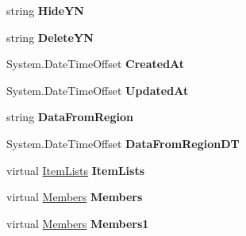 \begin{DoxyCompactItemize}
\item 
string {\bfseries Hide\+YN}\hypertarget{a00086_a8b5c381c2fc95ff3c9af4b7e09e40509}{}\label{a00086_a8b5c381c2fc95ff3c9af4b7e09e40509}

\item 
string {\bfseries Delete\+YN}\hypertarget{a00086_a3663bcb7a483754cc1fd3bb95c24a13a}{}\label{a00086_a3663bcb7a483754cc1fd3bb95c24a13a}

\item 
System.\+Date\+Time\+Offset {\bfseries Created\+At}\hypertarget{a00086_a8c30acc3e2c53178185283532017a44f}{}\label{a00086_a8c30acc3e2c53178185283532017a44f}

\item 
System.\+Date\+Time\+Offset {\bfseries Updated\+At}\hypertarget{a00086_a857bd29f955696106cbe25c9bc37d7ae}{}\label{a00086_a857bd29f955696106cbe25c9bc37d7ae}

\item 
string {\bfseries Data\+From\+Region}\hypertarget{a00086_a5726782f5a6932f232393bdb9df4190c}{}\label{a00086_a5726782f5a6932f232393bdb9df4190c}

\item 
System.\+Date\+Time\+Offset {\bfseries Data\+From\+Region\+DT}\hypertarget{a00086_a8ed62b55fc18a4419620138693a321e0}{}\label{a00086_a8ed62b55fc18a4419620138693a321e0}

\item 
virtual \hyperlink{a00127}{Item\+Lists} {\bfseries Item\+Lists}\hypertarget{a00086_a7217ae90802d5d8f4e247995ae04c122}{}\label{a00086_a7217ae90802d5d8f4e247995ae04c122}

\item 
virtual \hyperlink{a00145}{Members} {\bfseries Members}\hypertarget{a00086_a4b30bddd0e473bb3435fab0027792c06}{}\label{a00086_a4b30bddd0e473bb3435fab0027792c06}

\item 
virtual \hyperlink{a00145}{Members} {\bfseries Members1}\hypertarget{a00086_a8b402150625f5539b7f609dac10630e0}{}\label{a00086_a8b402150625f5539b7f609dac10630e0}

\end{DoxyCompactItemize}



